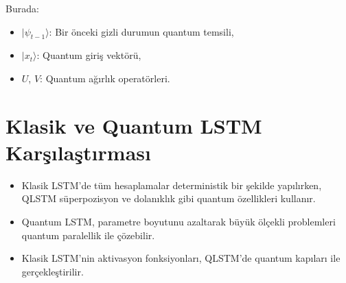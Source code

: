 \documentclass[a4paper,12pt]{article}
\begin{document}
Burada:
\begin{itemize}
    \item $|\psi_{t-1}\rangle$: Bir önceki gizli durumun quantum temsili,
    \item $|x_t\rangle$: Quantum giriş vektörü,
    \item $U$, $V$: Quantum ağırlık operatörleri.
\end{itemize}

\section*{Klasik ve Quantum LSTM Karşılaştırması}
\begin{itemize}
    \item Klasik LSTM'de tüm hesaplamalar deterministik bir şekilde yapılırken, QLSTM süperpozisyon ve dolanıklık gibi quantum özellikleri kullanır.
    \item Quantum LSTM, parametre boyutunu azaltarak büyük ölçekli problemleri quantum paralellik ile çözebilir.
    \item Klasik LSTM'nin aktivasyon fonksiyonları, QLSTM'de quantum kapıları ile gerçekleştirilir.
\end{itemize}
\end{document}
